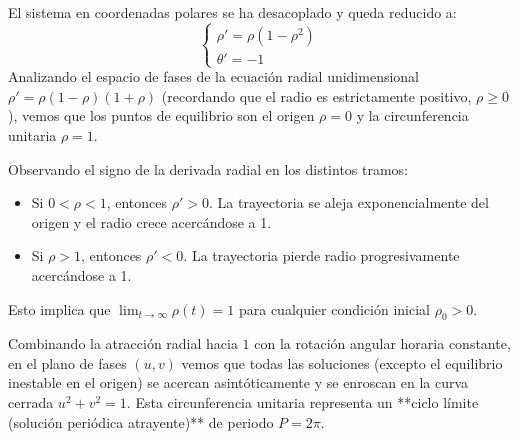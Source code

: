 {    El sistema en coordenadas polares se ha desacoplado y queda reducido a:
    \[
        \begin{cases}
            \rho' = \rho(1 - \rho^2) \\
            \theta' = -1
        \end{cases}
    \]
    Analizando el espacio de fases de la ecuación radial unidimensional $\rho' = \rho(1-\rho)(1+\rho)$ (recordando que el radio es estrictamente positivo, $\rho \ge 0$), vemos que los puntos de equilibrio son el origen $\rho = 0$ y la circunferencia unitaria $\rho = 1$.
    
    Observando el signo de la derivada radial en los distintos tramos:
    \begin{itemize}
        \item Si $0 < \rho < 1$, entonces $\rho' > 0$. La trayectoria se aleja exponencialmente del origen y el radio crece acercándose a 1.
        \item Si $\rho > 1$, entonces $\rho' < 0$. La trayectoria pierde radio progresivamente acercándose a 1.
    \end{itemize}
    Esto implica que $\lim_{t \to \infty} \rho(t) = 1$ para cualquier condición inicial $\rho_0 > 0$. 
    
    Combinando la atracción radial hacia $1$ con la rotación angular horaria constante, en el plano de fases $(u,v)$ vemos que todas las soluciones (excepto el equilibrio inestable en el origen) se acercan asintóticamente y se enroscan en la curva cerrada $u^2+v^2 = 1$. Esta circunferencia unitaria representa un **ciclo límite (solución periódica atrayente)** de periodo $P = 2\pi$. 
    
    \begin{center}
\end{center}}
